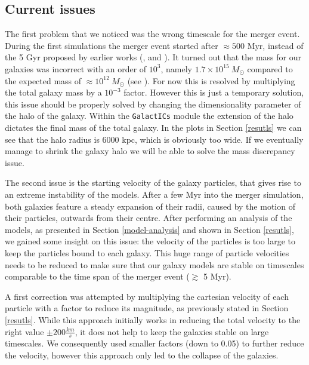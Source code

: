 \documentclass[a4paper,12pt, english]{article}
\begin{document}
\subsection{Current issues}
The first problem that we noticed was the wrong timescale for the merger event. During the first simulations the merger event started after \(\approx 500\) Myr, instead of the 5 Gyr proposed by earlier works (\textcite{Cox_2008},\textcite{van_der_Marel_2019} and \textcite{Schiavi_2019}). It turned out that the mass for our galaxies was incorrect with an order of $10^3$, namely \(1.7 \times 10^{15}\: M_{\odot}\) compared to the expected mass of \(\approx 10^{12}\: M_{\odot}\) (see \textcite{Watkins_2019}). For now this is resolved by multiplying the total galaxy mass by a  $10^{-3}$ factor. However this is just a temporary solution, this issue should be properly solved by changing the dimensionality parameter of the halo of the galaxy. Within the \texttt{GalactICs} module the extension of the halo dictates the final mass of the total galaxy. In the plots in Section \ref{resutls} we can see that the halo radius is 6000 kpc, which is obviously too wide. If we eventually manage to shrink the galaxy halo we will be able to solve the mass discrepancy issue.\par
\smallskip
The second issue is the starting velocity of the galaxy particles, that gives rise to an extreme instability of the models. After a few Myr into the merger simulation, both galaxies feature a steady expansion of their radii, caused by the motion of their particles, outwards from their centre. After performing an analysis of the models, as presented in Section \ref{model-analysis} and shown in Section \ref{resutls}, we gained some insight on this issue: the velocity of the particles is too large to keep the particles bound to each galaxy. This huge range of particle velocities needs to be reduced to make sure that our galaxy models are stable on timescales comparable to the time span of the merger event (\(\gtrsim\) 5 Myr).\par
\smallskip
A first correction was attempted by multiplying the cartesian velocity of each particle with a factor to reduce its magnitude, as previously stated in Section \ref{resutls}. While this approach initially works in reducing the total velocity to the right value $\pm 200\frac{km}{s}$, it does not help to keep the galaxies stable on large timescales. We consequently used smaller factors (down to 0.05) to further reduce the velocity, however this approach only led to the collapse of the galaxies.\par
\end{document}
